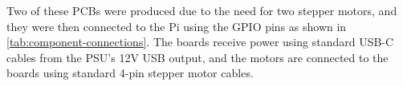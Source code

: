 Two of these PCBs were produced due to the need for two stepper motors, and they were then connected to the Pi using the GPIO pins as shown in \autoref{tab:component-connections}. The boards receive power using standard USB-C cables from the PSU's 12V USB output, and the motors are connected to the boards using standard 4-pin stepper motor cables.